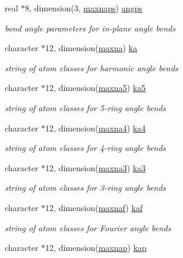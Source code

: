 \begin{DoxyCompactItemize}
real $\ast$8, dimension(3, \hyperlink{classkangs_a6646c9ed34bc273addaebe53e7ece288}{maxnaps}) \hyperlink{classkangs_a9ff1f1899f2b1a3fed39948f73c9cb60}{angps}
\begin{DoxyCompactList}\small\item\em bond angle parameters for in-\/plane angle bends \end{DoxyCompactList}\item 
character $\ast$12, dimension(\hyperlink{classkangs_a219b9491df85352c42fb06b082f1fce2}{maxna}) \hyperlink{classkangs_a804ce0bed5df2597765f5bdef9ec926c}{ka}
\begin{DoxyCompactList}\small\item\em string of atom classes for harmonic angle bends \end{DoxyCompactList}\item 
character $\ast$12, dimension(\hyperlink{classkangs_af188b59476d50504dd8aa39359285894}{maxna5}) \hyperlink{classkangs_a5dbf7fa314a6017c799bfe2f3acb1a4b}{ka5}
\begin{DoxyCompactList}\small\item\em string of atom classes for 5-\/ring angle bends \end{DoxyCompactList}\item 
character $\ast$12, dimension(\hyperlink{classkangs_a65b59f16cd39d33f1686bf32e362e6c9}{maxna4}) \hyperlink{classkangs_a7bb1f15f3487d97419dced289b6236c1}{ka4}
\begin{DoxyCompactList}\small\item\em string of atom classes for 4-\/ring angle bends \end{DoxyCompactList}\item 
character $\ast$12, dimension(\hyperlink{classkangs_a121c0c19e92533f59e8c9b276e200da5}{maxna3}) \hyperlink{classkangs_a0a22676237c9ea47b00f2bcbd8dd55cc}{ka3}
\begin{DoxyCompactList}\small\item\em string of atom classes for 3-\/ring angle bends \end{DoxyCompactList}\item 
character $\ast$12, dimension(\hyperlink{classkangs_a3f749f34ae8245564a10206341a2dbdd}{maxnaf}) \hyperlink{classkangs_a33688ec74ecb124818ee49caddc6d717}{kaf}
\begin{DoxyCompactList}\small\item\em string of atom classes for Fourier angle bends \end{DoxyCompactList}\item 
character $\ast$12, dimension(\hyperlink{classkangs_aaa36915cbec793691849f7f04c409e24}{maxnap}) \hyperlink{classkangs_ac7bbbd307bb29d3b700975bdb4be82f8}{kap}

\end{DoxyCompactItemize}
